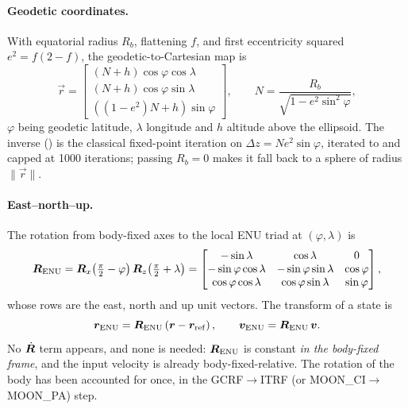 \paragraph{Geodetic coordinates.} With equatorial radius $R_b$, flattening
$f$, and first eccentricity squared $e^2 = f(2-f)$, the geodetic-to-Cartesian
map is
%
\begin{equation}
  \label{eq:fc-lla}
  \vec{r} =
  \begin{bmatrix}
    (N+h)\cos\varphi\cos\lambda \\
    (N+h)\cos\varphi\sin\lambda \\
    \left((1-e^2)N+h\right)\sin\varphi
  \end{bmatrix},
  \qquad
  N = \frac{R_b}{\sqrt{1-e^2\sin^2\varphi}},
\end{equation}
%
$\varphi$ being geodetic latitude, $\lambda$ longitude and $h$ altitude
above the ellipsoid. The inverse () is the classical
fixed-point iteration on $\Delta z = N e^2 \sin\varphi$, iterated to
 and capped at 1000 iterations; passing $R_b = 0$ makes it fall
back to a sphere of radius $\lVert\vec{r}\rVert$.

\paragraph{East--north--up.} The rotation from body-fixed axes to the local
ENU triad at $(\varphi,\lambda)$ is
%
\begin{equation}
  \label{eq:fc-enu-rot}
  \bm{R}_{\mathrm{ENU}}
  = \bm{R}_x\!\left(\tfrac{\pi}{2}-\varphi\right)
    \bm{R}_z\!\left(\tfrac{\pi}{2}+\lambda\right)
  = \begin{bmatrix}
      -\sin\lambda & \cos\lambda & 0 \\
      -\sin\varphi\cos\lambda & -\sin\varphi\sin\lambda & \cos\varphi \\
      \cos\varphi\cos\lambda & \cos\varphi\sin\lambda & \sin\varphi
    \end{bmatrix},
\end{equation}
%
whose rows are the east, north and up unit vectors. The transform of a
state is
%
\begin{equation}
  \label{eq:fc-enu}
  \bm{r}_{\mathrm{ENU}} = \bm{R}_{\mathrm{ENU}}\left(\bm{r}-\bm{r}_{\mathrm{ref}}\right),
  \qquad
  \bm{v}_{\mathrm{ENU}} = \bm{R}_{\mathrm{ENU}}\,\bm{v} .
\end{equation}
%
No $\dot{\bm{R}}$ term appears, and none is needed: $\bm{R}_{\mathrm{ENU}}$
is constant \emph{in the body-fixed frame}, and the input velocity is
already body-fixed-relative. The rotation of the body has been accounted for
once, in the GCRF$\to$ITRF (or MOON\_CI$\to$MOON\_PA) step.

